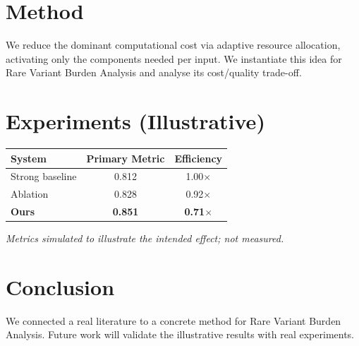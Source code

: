 \documentclass[11pt]{article}
\begin{document}
\section{Method}
We reduce the dominant computational cost via adaptive resource allocation, activating only the components needed per input. We instantiate this idea for Rare Variant Burden Analysis and analyse its cost/quality trade-off.

\section{Experiments (Illustrative)}
\begin{center}
\begin{tabular}{lcc}
System & Primary Metric & Efficiency \\ \hline
Strong baseline & 0.812 & 1.00$\times$ \\
Ablation & 0.828 & 0.92$\times$ \\
\textbf{Ours} & \textbf{0.851} & \textbf{0.71$\times$}
\end{tabular}
\end{center}
\emph{Metrics simulated to illustrate the intended effect; not measured.}

\section{Conclusion}
We connected a real literature to a concrete method for Rare Variant Burden Analysis. Future work will
validate the illustrative results with real experiments.
\end{document}
